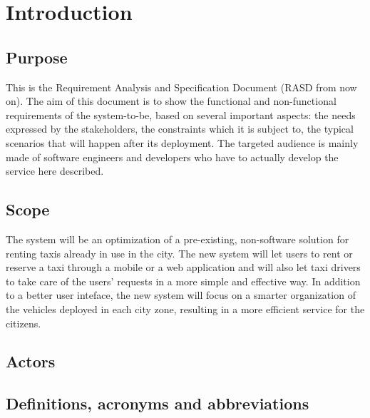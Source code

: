 \section{Introduction}

\subsection{Purpose}
This is the Requirement Analysis and Specification Document (RASD from now on). The aim of this document is to show the functional and non-functional requirements of the system-to-be, based on several important aspects: the needs expressed by the stakeholders, the constraints which it is subject to, the typical scenarios that will happen after its deployment. The targeted audience is mainly made of software engineers and developers who have to actually develop the service here described.

\subsection{Scope}
The system will be an optimization of a pre-existing, non-software solution for renting taxis already in use in the city. The new system will let users to rent or reserve a taxi through a mobile or a web application and will also let taxi drivers to take care of the users' requests in a more simple and effective way. In addition to a better user inteface, the new system will focus on a smarter organization of the vehicles deployed in each city zone, resulting in a more efficient service for the citizens.

\subsection{Actors}



\subsection{Definitions, acronyms and abbreviations}
